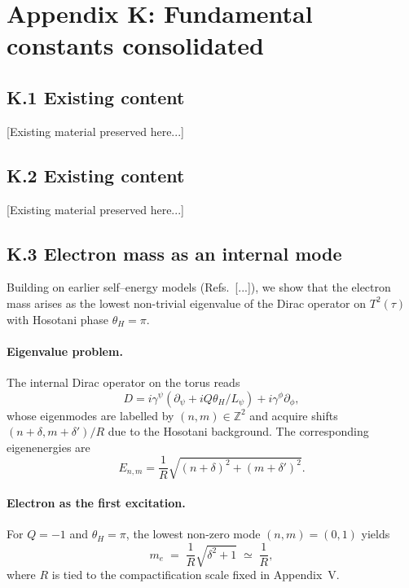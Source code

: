 
\appendix
\section*{Appendix K: Fundamental constants consolidated}


\subsection*{K.1 Existing content}
[Existing material preserved here...]

\subsection*{K.2 Existing content}
[Existing material preserved here...]

\subsection*{K.3 Electron mass as an internal mode}

Building on earlier self–energy models (Refs.~[...]), we show that the electron 
mass arises as the lowest non-trivial eigenvalue of the Dirac operator on 
$T^2(\tau)$ with Hosotani phase $\theta_H=\pi$. 

\paragraph{Eigenvalue problem.}
The internal Dirac operator on the torus reads
\begin{equation}
D = i\gamma^\psi \left(\partial_\psi + i Q \theta_H/L_\psi\right) 
  + i\gamma^\phi \partial_\phi ,
\end{equation}
whose eigenmodes are labelled by $(n,m)\in\mathbb{Z}^2$ and acquire shifts 
$(n+\delta, m+\delta')/R$ due to the Hosotani background. 
The corresponding eigenenergies are
\begin{equation}
E_{n,m} = \frac{1}{R}\sqrt{(n+\delta)^2 + (m+\delta')^2}.
\end{equation}

\paragraph{Electron as the first excitation.}
For $Q=-1$ and $\theta_H=\pi$, the lowest non-zero mode $(n,m)=(0,1)$ yields 
\begin{equation}
m_e \;=\; \frac{1}{R}\sqrt{\delta^2+1}\;\simeq\;\frac{1}{R},
\end{equation}
where $R$ is tied to the compactification scale fixed in Appendix~V. 

